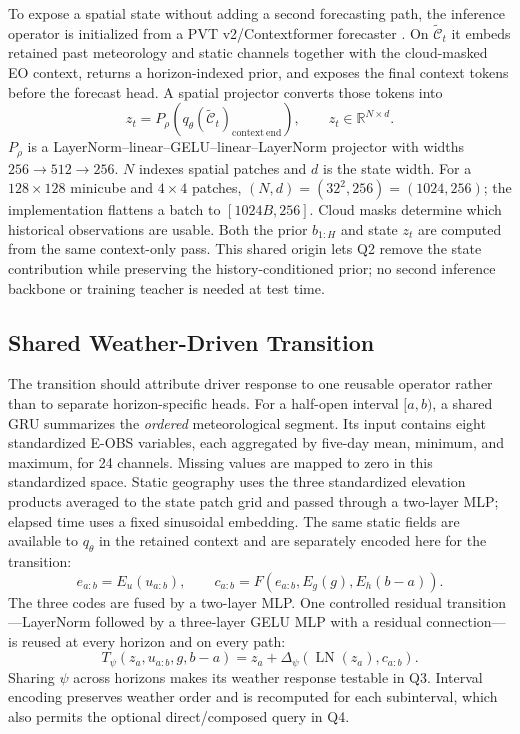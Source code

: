 \documentclass[letterpaper]{article} %
\begin{document}
To expose a spatial state without adding a second forecasting path, the
inference operator is initialized from a PVT v2/Contextformer forecaster
\cite{wang2022pvtv2,benson2024multimodal}. On
$\widetilde{\mathcal C}_t$ it embeds retained past meteorology and static
channels together with the cloud-masked EO context, returns a horizon-indexed
prior, and exposes the final context tokens before the forecast head. A spatial
projector converts those tokens into
\begin{equation}
z_t=P_\rho\!\left(
q_\theta(\widetilde{\mathcal C}_t)_{\mathrm{context\ end}}\right),
\qquad z_t\in\mathbb R^{N\times d}.
\label{eq:state}
\end{equation}
$P_\rho$ is a LayerNorm--linear--GELU--linear--LayerNorm projector with widths
$256\!\rightarrow\!512\!\rightarrow\!256$. $N$ indexes spatial patches and
$d$ is the state width. For a $128\times128$ minicube and $4\times4$ patches,
$(N,d)=(32^2,256)=(1024,256)$; the implementation flattens a batch to
$[1024B,256]$. Cloud masks determine which historical observations are usable.
Both the prior $b_{1:H}$ and state $z_t$ are computed from the same context-only
pass. This shared origin lets Q2 remove the state contribution while preserving
the history-conditioned prior; no second inference backbone or training teacher
is needed at test time.

\subsection{Shared Weather-Driven Transition}

The transition should attribute driver response to one reusable operator rather
than to separate horizon-specific heads. For a half-open interval $[a,b)$, a
shared GRU summarizes the \emph{ordered}
meteorological segment. Its input contains eight standardized E-OBS variables,
each aggregated by five-day mean, minimum, and maximum, for 24 channels.
Missing values are mapped to zero in this standardized space. Static geography
uses the three standardized elevation products averaged to the state patch
grid and passed through a two-layer MLP; elapsed time uses a fixed sinusoidal
embedding. The same static fields are available to $q_\theta$ in the retained
context and are separately encoded here for the transition:
\begin{equation}
e_{a:b}=E_u(u_{a:b}),\qquad
c_{a:b}=F\!\left(e_{a:b},E_g(g),E_h(b-a)\right).
\label{eq:condition}
\end{equation}
The three codes are fused by a two-layer MLP. One controlled residual
transition---LayerNorm followed by a three-layer GELU MLP with a residual
connection---is reused at every horizon and on every path:
\begin{equation}
T_\psi(z_a,u_{a:b},g,b-a)
=z_a+\Delta_\psi\!\left(\operatorname{LN}(z_a),c_{a:b}\right).
\label{eq:transition}
\end{equation}
Sharing $\psi$ across horizons makes its weather response testable in Q3.
Interval encoding preserves weather order and is recomputed for each
subinterval, which also permits the optional direct/composed query in Q4.
\end{document}
